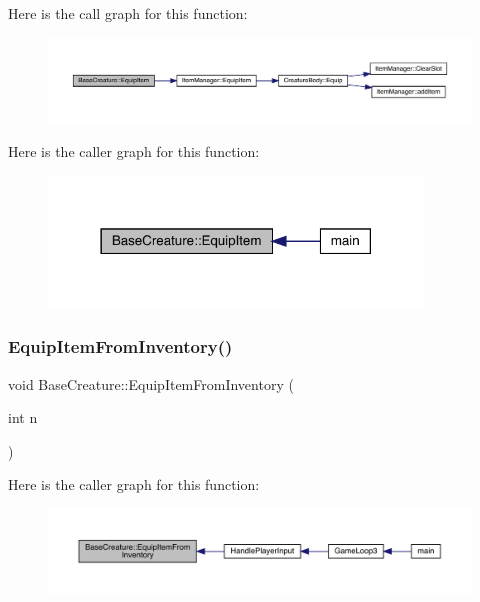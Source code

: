 Here is the call graph for this function\+:
\nopagebreak
\begin{figure}[H]
\begin{center}
\leavevmode
\includegraphics[width=350pt]{d2/d3b/class_base_creature_a1e73375251b20070ae9dac505b280b3e_cgraph}
\end{center}
\end{figure}
Here is the caller graph for this function\+:
\nopagebreak
\begin{figure}[H]
\begin{center}
\leavevmode
\includegraphics[width=282pt]{d2/d3b/class_base_creature_a1e73375251b20070ae9dac505b280b3e_icgraph}
\end{center}
\end{figure}
\mbox{\label{class_base_creature_a637cb7174d9bb9677a21281ff19fb10a}} 
\subsubsection{\texorpdfstring{Equip\+Item\+From\+Inventory()}{EquipItemFromInventory()}}
{\footnotesize\ttfamily void Base\+Creature\+::\+Equip\+Item\+From\+Inventory (\begin{DoxyParamCaption}\item[{int}]{n }\end{DoxyParamCaption})}

Here is the caller graph for this function\+:
\nopagebreak
\begin{figure}[H]
\begin{center}
\leavevmode
\includegraphics[width=350pt]{d2/d3b/class_base_creature_a637cb7174d9bb9677a21281ff19fb10a_icgraph}
\end{center}
\end{figure}
\mbox{\label{class_base_creature_ac04efe1dda147e264998609635baadb6}} 
